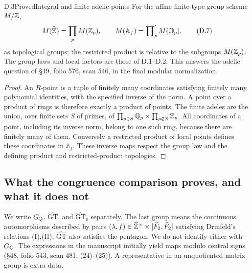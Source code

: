 \begin{statement}{D.3}{Proved}{Integral and finite adelic points}
For the affine finite-type group scheme \(M/\mathbb Z\),
\[
 M(\widehat{\mathbb Z})=\prod_p M(\mathbb Z_p),\qquad
 M(\mathbb A_f)=\prod\nolimits_p' M(\mathbb Q_p),
 \tag{D.7}
\]
as topological groups; the restricted product is relative to the
subgroups \(M(\mathbb Z_p)\).  The group laws and local factors are those
of D.1--D.2.  This answers the adelic question of \S49,
folio 576, scan 546, in the final modular normalization.
\end{statement}
\begin{proof}
An \(R\)-point is a tuple of finitely many coordinates satisfying
finitely many polynomial identities, with the specified inverse of
the norm.  A point over a product of rings is therefore exactly a
product of points.  The finite adeles are the union, over finite
sets \(S\) of primes, of
\(\prod_{p\in S}\mathbb Q_p\times\prod_{p\notin S}\mathbb Z_p\).
All coordinates of a point, including its inverse norm, belong
to one such ring, because there are finitely many of them.
Conversely a restricted product of local points defines these
coordinates in \(\mathbb A_f\).  These inverse maps respect the
group law and the defining product and restricted-product
topologies.
\end{proof}

\subsection{What the congruence comparison proves, and what it does not}

We write \(G_{\mathbb Q}\), \(\widehat{\mathrm{GT}}\), and
\(\widehat{\mathrm{GT}}_0\) separately.  The last group means the
continuous automorphisms described by pairs
\((\lambda,f)\in\widehat{\mathbb Z}^{\times}\times
[\widehat F_2,\widehat F_2]\) satisfying Drinfeld's relations
(I),(II); \(\widehat{\mathrm{GT}}\) also satisfies the pentagon.
We do not identify either with \(G_\mathbb Q\).
The expressions in the manuscript initially yield maps modulo
central signs (\S48, folio 543, scan 481, (24)--(25)).
A representative in an unquotiented matrix group is extra data.

